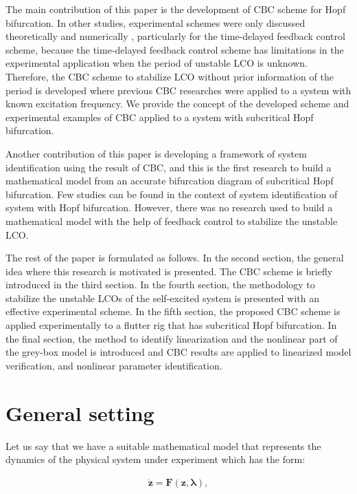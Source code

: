 \documentclass[openacc]{rsproca_new}%
\theoremstyle{own}
\def\vec#1{\ensuremath{\mathbf{#1}}}
\begin{document}
The main contribution of this paper is the development of CBC scheme for Hopf bifurcation. In other studies, experimental schemes were only discussed theoretically and numerically \cite{brown2011time,postlethwaite2013feedback}, particularly for the time-delayed feedback control scheme, because the time-delayed feedback control scheme has limitations in the experimental application when the period of unstable LCO is unknown. Therefore, the CBC scheme to stabilize LCO without prior information of the period is developed where previous CBC researches were applied to a system with known excitation frequency. We provide the concept of the developed scheme and experimental examples of CBC applied to a system with subcritical Hopf bifurcation.

Another contribution of this paper is developing a framework of system identification using the result of CBC, and this is the first research to build a mathematical model from an accurate bifurcation diagram of subcritical Hopf bifurcation. Few studies \cite{abdelkefi2013analytical,thothadri2005nonlinear} can be found in the context of system identification of system with Hopf bifurcation. However, there was no research used to build a mathematical model with the help of feedback control to stabilize the unstable LCO.

The rest of the paper is formulated as follows. In the second section, the general idea where this research is motivated is presented. The CBC scheme is briefly introduced in the third section. In the fourth section, the methodology to stabilize the unstable LCOs of the self-excited system is presented with an effective experimental scheme. In the fifth section, the proposed CBC scheme is applied experimentally to a flutter rig that has subcritical Hopf bifurcation. In the final section, the method to identify linearization and the nonlinear part of the grey-box model is introduced and CBC results are applied to linearized model verification, and nonlinear parameter identification.

\section{General setting}\label{GS}
Let us say that we have a suitable mathematical model that represents the dynamics of the physical system under experiment which has the form:

\begin{align}\label{eq:gs}
  \dot{\vec{z}} =\vec{F}(\vec{z},\vec{\lambda}),
\end{align}
\end{document}
